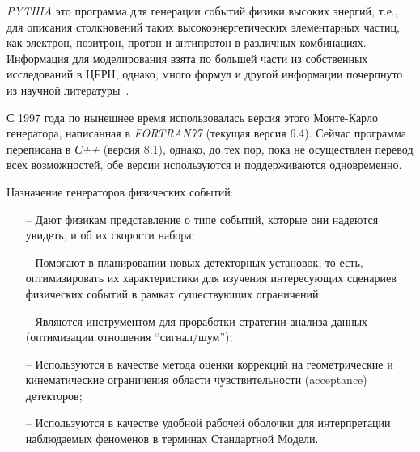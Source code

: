 \textit{PYTHIA} это программа для генерации событий физики
высоких энергий, т.е., для описания столкновений таких
высокоэнергетических элементарных частиц, как электрон,
позитрон, протон и антипротон в различных комбинациях.
Информация для моделирования взята по большей части из
собственных исследований в ЦЕРН, однако, много формул и
другой информации почерпнуто из научной литературы~\cite{review-pythia}.

С 1997 года по нынешнее время использовалась версия
этого Монте-Карло генератора, написанная в \textit{FORTRAN77}
(текущая версия 6.4). Сейчас программа переписана в \textit{С++}
(версия 8.1), однако, до тех пор, пока не осуществлен
перевод всех возможностей, обе версии используются и
поддерживаются одновременно.


Назначение генераторов физических событий:
\begin{itemize}
	\item[--] Дают физикам представление о типе событий, которые
	они надеются увидеть, и об их скорости набора;
	\item[--] Помогают в планировании новых детекторных установок,
	то есть, оптимизировать их характеристики для изучения
	интересующих сценариев физических событий в рамках
	существующих ограничений;
	\item[--] Являются инструментом для проработки стратегии
	анализа данных (оптимизации отношения “сигнал/шум”);
	\item[--] Используются в качестве метода оценки коррекций на
	геометрические и кинематические ограничения области
	чувствительности (acceptance) детекторов;
	\item[--] Используются в качестве удобной рабочей оболочки для
	интерпретации наблюдаемых феноменов в терминах
	Стандартной Модели.
\end{itemize}


